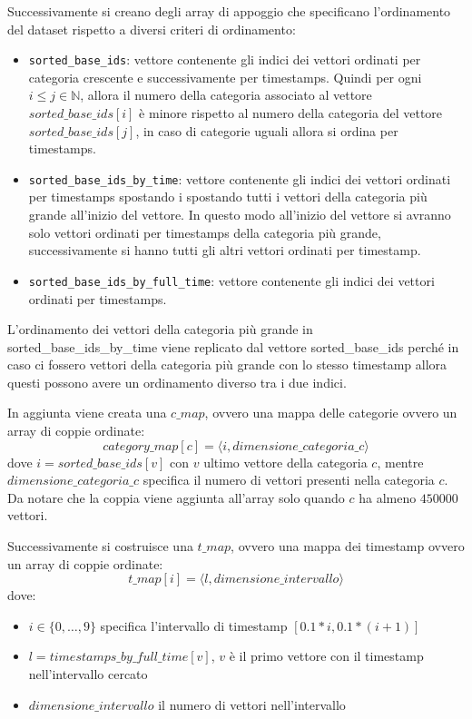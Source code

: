 Successivamente si creano degli array di appoggio che specificano l'ordinamento 
del dataset rispetto a diversi criteri di ordinamento:
\begin{itemize}
    \item \texttt{sorted\_base\_ids}: vettore contenente gli indici dei vettori ordinati 
    per categoria crescente e successivamente per timestamps. Quindi per ogni $i\le j\in \mathbb{N}$,
    allora il numero della categoria associato al vettore $sorted\_base\_ids[i]$
    è minore rispetto al numero della categoria del vettore $sorted\_base\_ids[j]$,
    in caso di categorie uguali allora si ordina per timestamps.
    \item \texttt{sorted\_base\_ids\_by\_time}: vettore contenente gli indici dei vettori ordinati 
    per timestamps spostando i spostando tutti i vettori della categoria più grande all'inizio 
    del vettore. In questo modo all'inizio del vettore si avranno solo vettori 
    ordinati per timestamps della categoria più grande, successivamente si hanno 
    tutti gli altri vettori ordinati per timestamp. 
    \item \texttt{sorted\_base\_ids\_by\_full\_time}: vettore contenente gli indici dei vettori ordinati 
    per timestamps.
\end{itemize}

\begin{nota}
    L'ordinamento dei vettori della categoria più grande in sorted\_base\_ids\_by\_time 
    viene replicato dal vettore sorted\_base\_ids perché in caso ci fossero vettori 
    della categoria più grande con lo stesso timestamp allora questi possono avere 
    un ordinamento diverso tra i due indici.
\end{nota}

In aggiunta viene creata una $c\_map$, ovvero una mappa delle categorie ovvero 
un array di coppie ordinate:
\begin{equation}
    category\_map[c] = \langle i, dimensione\_categoria\_c\rangle
\end{equation} 
dove $i = sorted\_base\_ids[v]$ con $v$ ultimo vettore della categoria $c$, 
mentre $dimensione\_categoria\_c$ specifica il numero di vettori presenti nella 
categoria $c$. Da notare che la coppia viene aggiunta all'array solo quando $c$ 
ha almeno $450000$ vettori.

Successivamente si costruisce una $t\_map$, ovvero una mappa dei timestamp ovvero 
un array di coppie ordinate:
\begin{equation}
    t\_map[i] = \langle l, dimensione\_intervallo\rangle
\end{equation} 
dove:
\begin{itemize}
    \item $i\in \{0,\dots,9\}$ specifica l'intervallo di timestamp $[0.1*i, 0.1*(i+1)]$
    \item $l= timestamps\_by\_full\_time[v]$, $v$ è il primo vettore con il timestamp nell'intervallo cercato
    \item $dimensione\_intervallo$ il numero di vettori nell'intervallo
\end{itemize}

